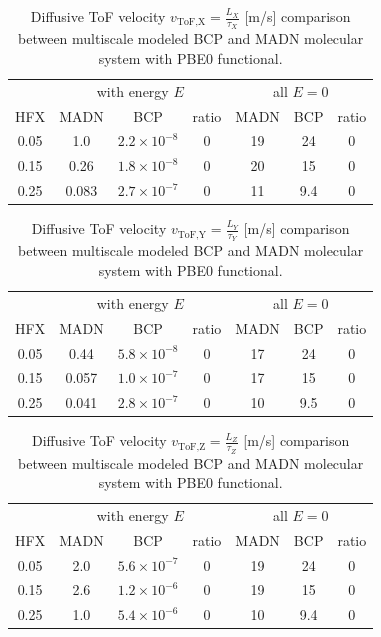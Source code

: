 \documentclass[letterpaper,12pt]{article}
\begin{document}
\begin{table}[htbp]
\centering
\begin{tabular}{c c c c c c c}
    \toprule
        &
        \multicolumn{3}{c}{ with energy $E$} &
        \multicolumn{3}{c}{all $E=0$}  \\
    HFX & MADN & BCP & ratio & MADN & BCP & ratio  \\
    \cmidrule(r){1-7}
    0.05 & 1.0 & $2.2 \times 10^{-8}$ & 0 & 19 & 24 & 0 \\
    0.15 & 0.26 & $1.8 \times 10^{-8}$ & 0 & 20 & 15 & 0 \\
    0.25 & 0.083 & $2.7 \times 10^{-7}$ & 0 & 11 & 9.4 & 0 \\
    \bottomrule
    \end{tabular}
    \caption{Diffusive ToF velocity $v_\text{ToF,X}=\frac{L_X}{\tau_X}$ [m/s] comparison between multiscale modeled BCP and MADN molecular system with PBE0 functional. }
\end{table}

\begin{table}[htbp]
\centering
\begin{tabular}{c c c c c c c}
    \toprule
        &
        \multicolumn{3}{c}{ with energy $E$} &
        \multicolumn{3}{c}{all $E=0$}  \\
    HFX & MADN & BCP & ratio & MADN & BCP & ratio  \\
    \cmidrule(r){1-7}
    0.05 & 0.44 & $5.8 \times 10^{-8}$ & 0 & 17 & 24 & 0 \\
    0.15 & 0.057& $1.0 \times 10^{-7}$  & 0 & 17 & 15 & 0 \\
    0.25 & 0.041 & $2.8 \times 10^{-7}$ & 0 & 10 & 9.5 & 0 \\
    \bottomrule
    \end{tabular}
    \caption{Diffusive ToF velocity $v_\text{ToF,Y}=\frac{L_Y}{\tau_Y}$ [m/s] comparison between multiscale modeled BCP and MADN molecular system with PBE0 functional. }
\end{table}

\begin{table}[htbp]
\centering
\begin{tabular}{c c c c c c c}
    \toprule
        &
        \multicolumn{3}{c}{ with energy $E$} &
        \multicolumn{3}{c}{all $E=0$}  \\
    HFX & MADN & BCP & ratio & MADN & BCP & ratio  \\
    \cmidrule(r){1-7}
    0.05 & 2.0 & $5.6 \times 10^{-7}$ & 0 & 19 & 24 & 0 \\
    0.15 & 2.6 & $1.2 \times 10^{-6}$ & 0 & 19 & 15 & 0 \\
    0.25 & 1.0 & $5.4 \times 10^{-6}$ & 0 & 10 & 9.4 & 0 \\
    \bottomrule
    \end{tabular}
    \caption{Diffusive ToF velocity $v_\text{ToF,Z}=\frac{L_Z}{\tau_Z}$ [m/s] comparison between multiscale modeled BCP and MADN molecular system with PBE0 functional. }
\end{table}
\end{document}
